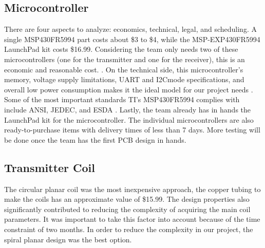 \documentclass[12pt]{article}
\begin{document}
\pagebreak

\subsection{Microcontroller}

\indent \indent
There are four aspects to analyze: economics, technical, legal, and scheduling. A single MSP430FR5994 part costs about \$3 to \$4, while the MSP-EXP430FR5994 LaunchPad kit costs \$16.99. Considering the team only needs two of these microcontrollers (one for the transmitter and one for the receiver), this is an economic and reasonable cost. \cite{MSP430FR599x}  \cite{testKit}. On the technical side, this microcontroller’s memory, voltage supply limitations, UART and I2Cmode specifications, and overall low power consumption makes it the ideal model for our project needs \cite{MSP430FR599x}. Some of the most important standards TI’s MSP430FR5994 complies with include ANSI, JEDEC, and ESDA \cite{MSP430FR599x}. Lastly, the team already has in hands the LaunchPad kit for the microcontroller. The individual microcontrollers are also ready-to-purchase items with delivery times of less than 7 days. More testing will be done once the team has the first PCB design in hands.


\subsection{Transmitter Coil}


\indent \indent
The circular planar coil was the most inexpensive approach, the copper tubing to make the coils has an approximate value of  \$15.99. The design properties also significantly contributed to reducing the complexity of acquiring the main coil parameters. It was important to take this factor into account because of the time constraint of two months. In order to reduce the complexity in our project, the spiral planar design was the best option.\\
\end{document}
